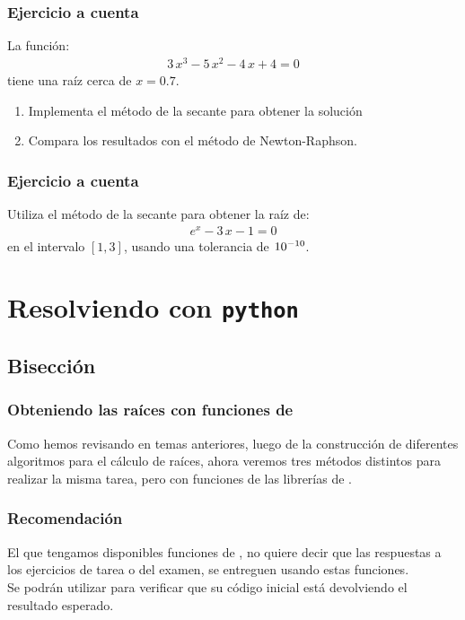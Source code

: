 \documentclass[12pt]{beamer}
\begin{document}
\begin{frame}
\frametitle{Ejercicio a cuenta}
La función:
\begin{align*}
3 \, x^{3} - 5 \, x^{2} -  4 \, x + 4 = 0
\end{align*}
tiene una raíz cerca de $x = 0.7$.
\begin{enumerate}[<+->]
\item Implementa el método de la secante para obtener la solución
\item Compara los resultados con el método de Newton-Raphson. 
\end{enumerate}
\end{frame}
\begin{frame}
\frametitle{Ejercicio a cuenta}
Utiliza el método de la secante para obtener la raíz de:
\begin{align*}
e^{x} - 3 \, x -1 = 0
\end{align*}
en el intervalo $[1, 3]$, usando una tolerancia de $\num{d-10}$.
\end{frame}

\section{Resolviendo con \texttt{python}}
\subsection{Bisección}

\begin{frame}
\frametitle{Obteniendo las raíces con funciones de \python}
Como hemos revisando en temas anteriores, luego de la construcción de diferentes algoritmos para el cálculo de raíces, ahora veremos tres métodos distintos para realizar la misma tarea, pero con funciones de las librerías de \python.
\end{frame}
\begin{frame}
\frametitle{Recomendación}
El que tengamos disponibles funciones de \python, no quiere decir que las respuestas a los ejercicios de tarea o del examen, se entreguen usando estas funciones.
\\
\bigskip
\pause
Se podrán utilizar para verificar que su código inicial está devolviendo el resultado esperado.
\end{frame}
\end{document}
